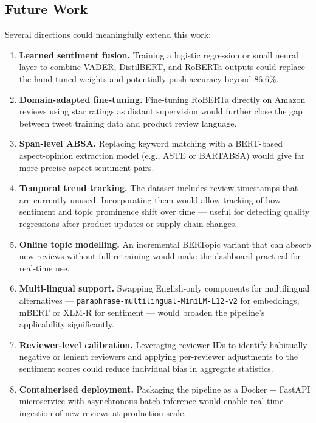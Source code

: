 \subsection{Future Work}
\begin{justify}
Several directions could meaningfully extend this work:

\begin{enumerate}
    \item \textbf{Learned sentiment fusion.} Training a logistic regression or small neural layer to combine VADER, DistilBERT, and RoBERTa outputs could replace the hand-tuned weights and potentially push accuracy beyond 86.6\%.

    \item \textbf{Domain-adapted fine-tuning.} Fine-tuning RoBERTa directly on Amazon reviews using star ratings as distant supervision would further close the gap between tweet training data and product review language.

    \item \textbf{Span-level ABSA.} Replacing keyword matching with a BERT-based aspect-opinion extraction model (e.g., ASTE or BARTABSA) would give far more precise aspect-sentiment pairs.

    \item \textbf{Temporal trend tracking.} The dataset includes review timestamps that are currently unused. Incorporating them would allow tracking of how sentiment and topic prominence shift over time — useful for detecting quality regressions after product updates or supply chain changes.

    \item \textbf{Online topic modelling.} An incremental BERTopic variant that can absorb new reviews without full retraining would make the dashboard practical for real-time use.

    \item \textbf{Multi-lingual support.} Swapping English-only components for multilingual alternatives — \texttt{paraphrase-multilingual-MiniLM-L12-v2} for embeddings, mBERT or XLM-R for sentiment — would broaden the pipeline's applicability significantly.

    \item \textbf{Reviewer-level calibration.} Leveraging reviewer IDs to identify habitually negative or lenient reviewers and applying per-reviewer adjustments to the sentiment scores could reduce individual bias in aggregate statistics.

    \item \textbf{Containerised deployment.} Packaging the pipeline as a Docker + FastAPI microservice with asynchronous batch inference would enable real-time ingestion of new reviews at production scale.
\end{enumerate}
\end{justify}
